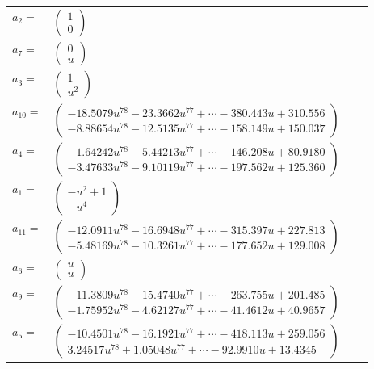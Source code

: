 \documentclass[1p]{elsarticle_modified}
\theoremstyle{definition}
\begin{document}
\begin{tabular}{m{7pt} m{180pt} m{7pt} m{180pt} }
\flushright $a_{2}=$&$\begin{pmatrix}1\\0\end{pmatrix}$ \\
\flushright $a_{7}=$&$\begin{pmatrix}0\\u\end{pmatrix}$ \\
\flushright $a_{3}=$&$\begin{pmatrix}1\\u^2\end{pmatrix}$ \\
\flushright $a_{10}=$&$\begin{pmatrix}-18.5079 u^{78}-23.3662 u^{77}+\cdots-380.443 u+310.556\\-8.88654 u^{78}-12.5135 u^{77}+\cdots-158.149 u+150.037\end{pmatrix}$ \\
\flushright $a_{4}=$&$\begin{pmatrix}-1.64242 u^{78}-5.44213 u^{77}+\cdots-146.208 u+80.9180\\-3.47633 u^{78}-9.10119 u^{77}+\cdots-197.562 u+125.360\end{pmatrix}$ \\
\flushright $a_{1}=$&$\begin{pmatrix}- u^2+1\\- u^4\end{pmatrix}$ \\
\flushright $a_{11}=$&$\begin{pmatrix}-12.0911 u^{78}-16.6948 u^{77}+\cdots-315.397 u+227.813\\-5.48169 u^{78}-10.3261 u^{77}+\cdots-177.652 u+129.008\end{pmatrix}$ \\
\flushright $a_{6}=$&$\begin{pmatrix}u\\u\end{pmatrix}$ \\
\flushright $a_{9}=$&$\begin{pmatrix}-11.3809 u^{78}-15.4740 u^{77}+\cdots-263.755 u+201.485\\-1.75952 u^{78}-4.62127 u^{77}+\cdots-41.4612 u+40.9657\end{pmatrix}$ \\
\flushright $a_{5}=$&$\begin{pmatrix}-10.4501 u^{78}-16.1921 u^{77}+\cdots-418.113 u+259.056\\3.24517 u^{78}+1.05048 u^{77}+\cdots-92.9910 u+13.4345\end{pmatrix}$ \\

\end{tabular}
\end{document}
